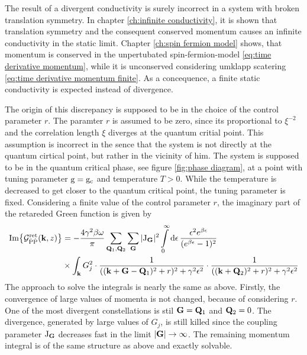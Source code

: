 The result of a divergent conductivity is surely incorrect in a system with broken translation symmetry.
In chapter \ref{ch:infinite conductivity}, it is shown that translation symmetry and the consequent conserved momentum causes an infinite conductivity in the static limit.
Chapter \ref{ch:spin fermion model} shows, that momentum is conserved in the unpertubated spin-fermion-model \eqref{eq:time derivative momentum}, while it is unconserved considering umklapp scatering \ref{eq:time derivative momentum finite}.
As a concequence, a finite static conductivity is expected instead of divergence.

The origin of this discrepancy is supposed to be in the choice of the control parameter $r$.
The paramter $r$ is assumed to be zero, since its proportional to $\xi^{-2}$ and the correlation length $\xi$ diverges at the quantum critial point.
This assumption is incorrect in the sence that the system is not directly at the quantum cirtical point, but rather in the vicinity of him.
The system is supposed to be in the quantum critical phase, see figure \ref{fig:phase diagram}, at a point with tuning parameter $\mathrm{g} = \mathrm{g}_{\mathrm{c}}$ and temperature $ T > 0$.
While the temperature is decreased to get closer to the quantum critical point, the tuning parameter is fixed.
Considering a finite value of the control parameter $r$, the imaginary part of the retareded Green function is given by
%
\begin{align}
	\Im{\mathcal{G}_{\dot{\mathrm{P}}\dot{\mathrm{P}}}^{\mathrm{ret}}(\vb{k}, z)} &= 
		-\frac{4 \gamma^{2} \beta \omega}{\pi}
		\sum\limits_{\vb{Q}_{1}, \vb{Q}_{2}}
		\sum\limits_{\vb{G}}
		\vert \mathrm{J}_{\vb{G}} \vert^{2}
		\int\limits_{0}^{\infty} \dd{\epsilon}
		\frac{\epsilon^{2} e^{\beta \epsilon}}{(e^{\beta \epsilon} - 1)^{2}}
		\notag \\
		&\times
		\int_{\vb{k}} G_{j}^{2} \cdot
		\frac{1}{((\vb{k}+\vb{G}-\vb{Q}_{1})^{2} + r)^{2} + \gamma^{2} \epsilon^{2}} \cdot
		\frac{1}{((\vb{k} + \vb{Q}_{2})^{2} + r)^{2} + \gamma^{2} \epsilon^{2}}
\end{align}
%
The approach to solve the integrals is nearly the same as above.
Firstly, the convergence of large values of momenta is not changed, because of considering $r$.
One of the most divergent constellations is stil $\vb{G} = \vb{Q}_{1}$ and $\vb{Q}_{2} = 0$.
The divergence, generated by large values of $G_{j}$, is still killed since the coupling parameter $\mathrm{J}_{\vb{G}}$ decreases fast in the limit $|\vb{G}| \to \infty$.
The remaining momentum integral is of the same structure as above and exactly solvable.
